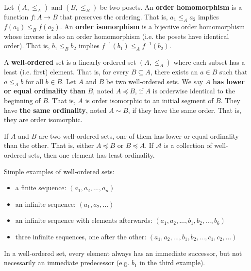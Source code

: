 \documentclass{bareminimum}
\def\ordleq{\preceq}
\def\ordeq{\sim}
\begin{document}
\begin{defn}
	Let $(A, \leq_A)$  and $(B, \leq_B)$ be two posets. An \textbf{order homomorphism} is a function $f : A \to B$ that preserves the ordering. That is, $a_1 \leq_A a_2$ implies $f(a_1) \leq_B f(a_2)$. An \textbf{order isomorphism} is a bijective order homomorphism whose inverse is also an order homomorphism (i.e. the posets have identical order). That is, $b_1 \leq_B b_2$ implies $f^{-1}(b_1) \leq_A f^{-1}(b_2)$.
\end{defn}

\begin{defn}
	A \textbf{well-ordered}  set is a linearly ordered set $(A, \leq_A)$ where each subset has a least (i.e. first) element. That is, for every $B \subseteq A$, there exists an $a \in B$ such that $a \leq_A b$ for all $b \in B$. Let $A$ and $B$ be two well-ordered sets. We say $A$ \textbf{has lower or equal ordinality than} $B$, noted $A \ordleq B$, if $A$ is orderwise identical to the beginning of $B$. That is, $A$ is order isomorphic to an initial segment of $B$. They have \textbf{the same ordinality}, noted $A \ordeq B$, if they have the same order. That is, they are order isomorphic.
\end{defn}

\begin{prop}[Ordinality]
	If $A$ and $B$ are two well-ordered sets, one of them has lower or equal ordinality than the other. That is, either $A \ordleq B$ or $B \ordleq A$. If $\mathcal{A}$ is a collection of well-ordered sets, then one element has least ordinality.
\end{prop}

\begin{remark}
	Simple examples of well-ordered sets:
	\begin{itemize}
		\item a finite sequence: $(a_1, a_2, ..., a_n)$
		\item an infinite sequence: $(a_1, a_2, ...)$
		\item an infinite sequence with elements afterwards: $(a_1, a_2, ..., b_1, b_2, ... , b_6)$
		\item three infinite sequences, one after the other: $(a_1, a_2, ..., b_1, b_2, ... , c_1, c_2, ...)$
	\end{itemize}
	In a well-ordered set, every element always has an immediate successor, but not necessarily an immediate predecessor (e.g. $b_1$ in the third example).
\end{remark}
\end{document}
